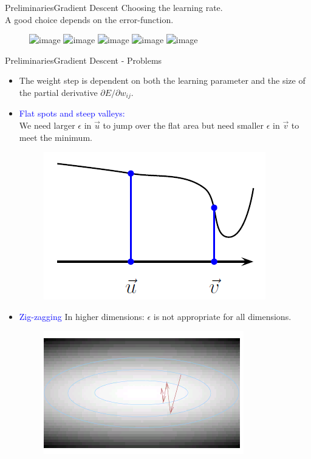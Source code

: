 \documentclass{beamer}
\begin{document}
\begin{frame}{Preliminaries}{Gradient Descent}
Choosing the learning rate. \\

A good choice depends on the error-function. 
\begin{figure}
	\includegraphics<1>[scale=0.5]{gd1}
	\includegraphics<2>[scale=0.5]{gd2}
	\includegraphics<3>[scale=0.5]{gd3}
	\includegraphics<4>[scale=0.5]{gd4}
	\includegraphics<5>[scale=0.5]{gd5}		
\end{figure}
	
\end{frame}	

\begin{frame}{Preliminaries}{Gradient Descent - Problems}
\begin{itemize}
\item The weight step is dependent on both the learning parameter and the size of the partial derivative $ \partial E / \partial w_{ij} $. 	

\pause
\item \textcolor{blue}{Flat spots and steep valleys:} \\
We need larger $ \epsilon $ in $ \vec{u} $ to jump over the flat area but need smaller $ \epsilon $ in $ \vec{v} $ to meet the minimum. 


\begin{figure}
\centering
\includegraphics[width=0.3\linewidth]{gdproblem}
\end{figure}

\item \textcolor{blue}{Zig-zagging}
In higher dimensions: $ \epsilon $ is not appropriate for all dimensions. 


\begin{figure}
\includegraphics[width=0.3\linewidth]{zig}
\end{figure}

\end{itemize}
\end{frame}
\end{document}
